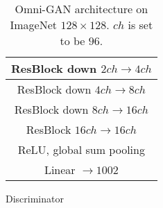 \documentclass[paper_2425.tex]{subfiles}
\begin{document}
\begin{table*}[htbp]
\begin{subtable}[t]{0.48\linewidth}
{\begin{tabular}{c}
        ResBlock down $2ch \rightarrow 4ch$                      \\ \midrule
        ResBlock down $4ch \rightarrow 8ch$                      \\ \midrule
        ResBlock down $8ch \rightarrow 16ch$                     \\ \midrule
        ResBlock $16ch \rightarrow 16ch$                         \\ \midrule
        ReLU, global sum pooling                                 \\ \midrule
        Linear $\rightarrow 1002$                                \\
        \bottomrule
      \end{tabular}}
    \caption{Discriminator}
  \end{subtable}
  \caption{Omni-GAN architecture on ImageNet $128\times128$. $ch$ is set to be $96$.}
  \label{apx:tab:omnigan_imagenet128}
\end{table*}
\end{document}
